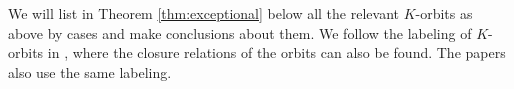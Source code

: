 \documentclass[12pt]{amsart}
\newcommand{\C}{\mathbb{C}}
\newcommand{\Orb}{\mathbb{O}}
\theoremstyle{definition}
\numberwithin{equation}{section}
\begin{document}



We will list in Theorem \ref{thm:exceptional} below all the relevant $K$-orbits as above by cases and make conclusions about them. We follow the labeling of $K$-orbits in  \cite{Dk1, Dk6, Dk5, Dk2, Dk3, Dk4, Dk7, Dk8}, where the closure relations of the orbits can also be found. The papers \cite{Noel1, Noel2} also use the same labeling. 
\end{document}
